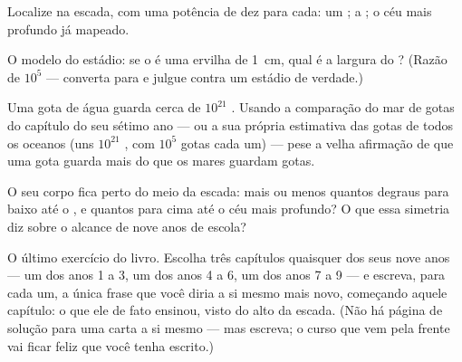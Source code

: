 \begin{exercise}[$\star$]\label{exo:g9:atoms-to-galaxies:8}
Localize na escada, com uma potência de dez para cada: um ; a
; o céu mais profundo já mapeado.
\end{exercise}

\begin{exercise}[$\star\star$]\label{exo:g9:atoms-to-galaxies:9}
O modelo do estádio: se o  é uma ervilha de \qty{1}{cm}, qual é
a largura do ? (Razão de $10^{5}$ --- converta para
 e julgue contra um estádio de verdade.)
\end{exercise}

\begin{exercise}[$\star\star$]\label{exo:g9:atoms-to-galaxies:10}
Uma gota de água guarda cerca de $10^{21}$ . Usando a
comparação do mar de gotas do capítulo do seu sétimo ano --- ou a sua
própria estimativa das gotas de todos os oceanos (uns $10^{21}$
, com $10^{5}$ gotas cada um) --- pese a velha afirmação de que
uma gota guarda mais  do que os mares guardam gotas.
\end{exercise}

\begin{exercise}[$\star\star$]\label{exo:g9:atoms-to-galaxies:11}
O seu corpo fica perto do meio da escada: mais ou menos quantos
degraus para baixo até o , e quantos para cima até o céu mais
profundo? O que essa simetria diz sobre o alcance de nove anos de
escola?
\end{exercise}

\begin{exercise}[$\star\star\star$]\label{exo:g9:atoms-to-galaxies:12}
O último exercício do livro. Escolha três capítulos quaisquer dos
seus nove anos --- um dos anos 1 a 3, um dos anos 4 a 6, um dos anos
7 a 9 --- e escreva, para cada um, a única frase que você diria a si
mesmo mais novo, começando aquele capítulo: o que ele de fato
ensinou, visto do alto da escada. (Não há página de solução para uma
carta a si mesmo --- mas escreva; o curso que vem pela frente vai
ficar feliz que você tenha escrito.)
\end{exercise}

